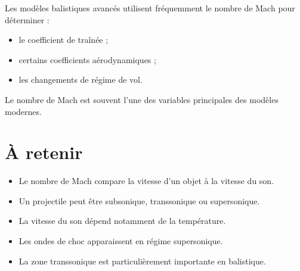 \begin{simulation}

Les modèles balistiques avancés utilisent fréquemment le nombre de Mach pour
déterminer :

\begin{itemize}
\item le coefficient de traînée ;
\item certains coefficients aérodynamiques ;
\item les changements de régime de vol.
\end{itemize}

Le nombre de Mach est souvent l'une des variables principales des modèles
modernes.

\end{simulation}

\section{À retenir}

\begin{aretenir}

\begin{itemize}
\item Le nombre de Mach compare la vitesse d'un objet à la vitesse du son.
\item Un projectile peut être subsonique, transsonique ou supersonique.
\item La vitesse du son dépend notamment de la température.
\item Les ondes de choc apparaissent en régime supersonique.
\item La zone transsonique est particulièrement importante en balistique.
\end{itemize}

\end{aretenir}

